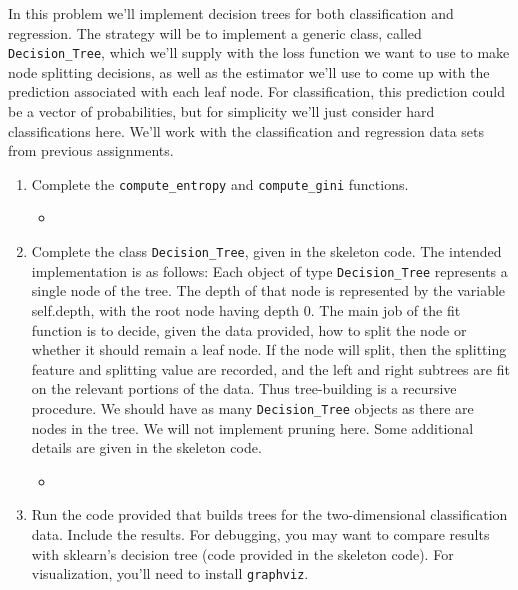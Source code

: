 \documentclass{article}
\theoremstyle{plain}
\theoremstyle{definition}
\begin{document}
In this problem we'll implement decision trees for both classification
and regression. The strategy will be to implement a generic class,
called \texttt{Decision\_Tree}, which we'll supply with the loss function
we want to use to make node splitting decisions, as well as the estimator
we'll use to come up with the prediction associated with each leaf
node. For classification, this prediction could be a vector of probabilities,
but for simplicity we'll just consider hard classifications here.
We'll work with the classification and regression data sets from previous
assignments.
\begin{enumerate}
\setcounter{enumi}{\value{saveenum}}
\item Complete the \texttt{compute\_entropy} and \texttt{compute\_gini}
functions.\\
          
           \begin{itemize}
           \color{blue}
               \item 
           \inputminted[firstline=32, lastline=54, breaklines=True]{python}{hw6.py}
\end{itemize}
           


\item Complete the class \texttt{Decision\_Tree}, given in
the skeleton code. The intended implementation is as follows: Each
object of type \texttt{Decision\_Tree} represents a single node of
the tree. The depth of that node is represented by the variable self.depth,
with the root node having depth 0. The main job of the fit function
is to decide, given the data provided, how to split the node or whether
it should remain a leaf node. If the node will split, then the splitting
feature and splitting value are recorded, and the left and right subtrees
are fit on the relevant portions of the data. Thus tree-building is
a recursive procedure. We should have as many \texttt{Decision\_Tree}
objects as there are nodes in the tree. We will not implement pruning\textbf{
}here. Some additional details are given in the skeleton code.\\

 \begin{itemize}
           \color{blue}
               \item 
           \inputminted[firstline=57, lastline=183, breaklines=True]{python}{hw6.py}
\end{itemize}

\item Run the code provided that builds trees for the two-dimensional
classification data. Include the results. For debugging, you may want
to compare results with sklearn's decision tree (code provided in the skeleton code). For visualization,
you'll need to install \texttt{graphviz}.\\


\end{enumerate}
\end{document}
